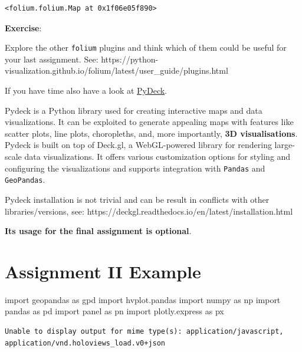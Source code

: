 \documentclass[
  letterpaper,
  DIV=11,
  numbers=noendperiod]{scrreprt}
\newenvironment{Shaded}{\begin{snugshade}}{\end{snugshade}}
\newcommand{\ImportTok}[1]{\textcolor[rgb]{0.00,0.46,0.62}{#1}}
\newcommand{\NormalTok}[1]{\textcolor[rgb]{0.00,0.23,0.31}{#1}}
\begin{document}
\begin{verbatim}
<folium.folium.Map at 0x1f06e05f890>
\end{verbatim}

\textbf{Exercise}:

Explore the other \texttt{folium} plugins and think which of them could
be useful for your last assignment. See:
https://python-visualization.github.io/folium/latest/user\_guide/plugins.html

If you have time also have a look at
\href{https://deckgl.readthedocs.io/en/latest/}{PyDeck}.

Pydeck is a Python library used for creating interactive maps and data
visualizations. It can be exploited to generate appealing maps with
features like scatter plots, line plots, choropleths, and, more
importantly, \textbf{3D visualisations}. Pydeck is built on top of
Deck.gl, a WebGL-powered library for rendering large-scale data
visualizations. It offers various customization options for styling and
configuring the visualizations and supports integration with
\texttt{Pandas} and \texttt{GeoPandas}.

Pydeck installation is not trivial and can be result in conflicts with
other libraries/versions, see:
https://deckgl.readthedocs.io/en/latest/installation.html

\textbf{Its usage for the final assignment is optional}.


\chapter{Assignment II Example}\label{assignment-ii-example}

\begin{Shaded}
\begin{Highlighting}[]
\ImportTok{import}\NormalTok{ geopandas }\ImportTok{as}\NormalTok{ gpd}
\ImportTok{import}\NormalTok{ hvplot.pandas}
\ImportTok{import}\NormalTok{ numpy }\ImportTok{as}\NormalTok{ np}
\ImportTok{import}\NormalTok{ pandas }\ImportTok{as}\NormalTok{ pd}
\ImportTok{import}\NormalTok{ panel }\ImportTok{as}\NormalTok{ pn}
\ImportTok{import}\NormalTok{ plotly.express }\ImportTok{as}\NormalTok{ px}
\end{Highlighting}
\end{Shaded}

\begin{verbatim}
Unable to display output for mime type(s): application/javascript, application/vnd.holoviews_load.v0+json
\end{verbatim}
\end{document}
